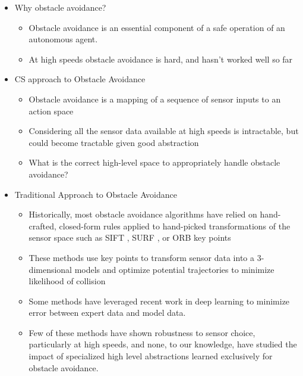 \documentclass[paper=a4, fontsize=11pt]{scrartcl} %
\begin{document}
\begin{itemize}
	\item Why obstacle avoidance?
	\begin{itemize}
		\item Obstacle avoidance is an essential component of a safe operation of an autonomous agent.
		\item At high speeds obstacle avoidance is hard, and hasn't worked well so far
	\end{itemize}

	\item CS approach to Obstacle Avoidance
	\begin{itemize}
		\item Obstacle avoidance is a mapping of a sequence of sensor inputs to an action space
		\item Considering all the sensor data available at high speeds is intractable, but could become tractable given good abstraction
		\item What is the correct high-level space to appropriately handle obstacle avoidance?
	\end{itemize}
		
	\item Traditional Approach to Obstacle Avoidance
	\begin{itemize}
		\item Historically, most obstacle avoidance algorithms have relied on hand-crafted, closed-form rules applied to hand-picked transformations of the sensor space such as SIFT \cite{lowe1999object}, SURF \cite{bay2006surf}, or ORB key points \cite{rublee2011orb}
		\item These methods use key points to transform sensor data into a 3-dimensional models and optimize potential trajectories to minimize likelihood of collision
		\item Some methods have leveraged recent work in deep learning to minimize error between expert data and model data.
		\item Few of these methods have shown robustness to sensor choice, particularly at high speeds, and none, to our knowledge, have studied the impact of specialized high level abstractions learned exclusively for obstacle avoidance.
	\end{itemize}


\end{itemize}
\end{document}
